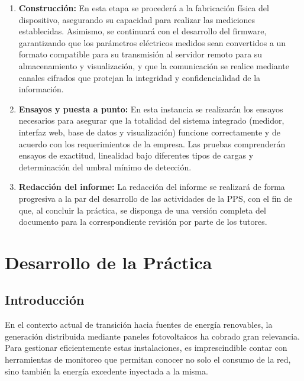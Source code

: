 \documentclass[12pt, a4paper]{article} %
\begin{document}
\begin{enumerate}
  \item \textbf{Construcción:} En esta etapa se procederá a la fabricación física del dispositivo, asegurando su capacidad para realizar las mediciones establecidas. Asimismo, se continuará con el desarrollo del firmware, garantizando que los parámetros eléctricos medidos sean convertidos a un formato compatible para su transmisión al servidor remoto para su almacenamiento y visualización, y que la comunicación se realice mediante canales cifrados que protejan la integridad y confidencialidad de la información.
  \item \textbf{Ensayos y puesta a punto:} En esta instancia se realizarán los ensayos necesarios para asegurar que la totalidad del sistema integrado (medidor, interfaz web, base de datos y visualización) funcione correctamente y de acuerdo con los requerimientos de la empresa. Las pruebas comprenderán ensayos de exactitud, linealidad bajo diferentes tipos de cargas y determinación del umbral mínimo de detección.
  \item \textbf{Redacción del informe:} La redacción del informe se realizará de forma progresiva a la par del desarrollo de las actividades de la PPS, con el fin de que, al concluir la práctica, se disponga de una versión completa del documento para la correspondiente revisión por parte de los tutores.
\end{enumerate}



\section{Desarrollo de la Práctica}

\subsection{Introducción}

En el contexto actual de transición hacia fuentes de energía renovables, la generación distribuida mediante paneles fotovoltaicos ha cobrado gran relevancia. Para gestionar eficientemente estas instalaciones, es imprescindible contar con herramientas de monitoreo que permitan conocer no solo el consumo de la red, sino también la energía excedente inyectada a la misma.
\end{document}
